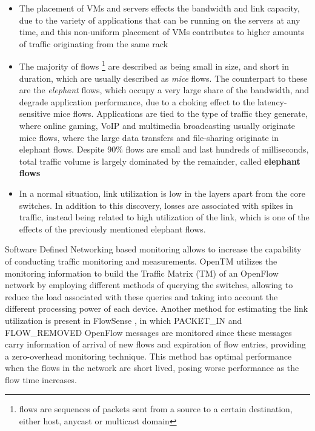 \begin {itemize}
    \item The placement of VMs and servers effects the bandwidth and link capacity, due to the variety of applications that can be running on the servers at any time,
        and this non-uniform placement of VMs contributes to higher amounts of traffic originating from the same rack
    \item The majority of flows \footnote {flows are sequences of packets sent from a source to a certain destination, either host, anycast or multicast domain} 
        are described as being small in size, and short in duration, which are usually described as \textit {mice} flows. 
        The counterpart to these are the \textit {elephant} flows, which occupy a very large share of the bandwidth, and degrade application performance, due to a
        choking effect to the latency-sensitive mice flows. 
        Applications are tied to the type of traffic they generate, where online gaming, VoIP and multimedia broadcasting usually originate mice flows, where the 
        large data transfers and file-sharing originate in elephant flows. Despite 90\% flows are small and last hundreds of milliseconds, total traffic volume is 
        largely dominated by the remainder, called \textbf{elephant flows} \cite{benson_network_2010}
    \item In a normal situation, link utilization is low in the layers apart from the core switches. In addition to this discovery, losses are associated with 
        spikes in traffic, instead being related to high utilization  of the link, which is one of the effects of the previously mentioned elephant flows.
\end {itemize}

\par Software Defined Networking based monitoring allows to increase the capability of conducting traffic monitoring and measurements. OpenTM 
\cite{krishnamurthy_passive_2010} utilizes the monitoring information to build the Traffic Matrix (TM) of an OpenFlow network by employing different methods of 
querying the switches, allowing to reduce the load associated with these queries and taking into account the different processing power of each device. Another 
method for estimating the link utilization is present in FlowSense \cite{yu_flowsense:_2013}, in which PACKET\_IN and FLOW\_REMOVED OpenFlow messages 
are monitored since these messages carry information of arrival of new flows and expiration of flow entries, providing a zero-overhead monitoring technique. This 
method has optimal performance when the flows in the network are short lived, posing worse performance as the flow time increases.

